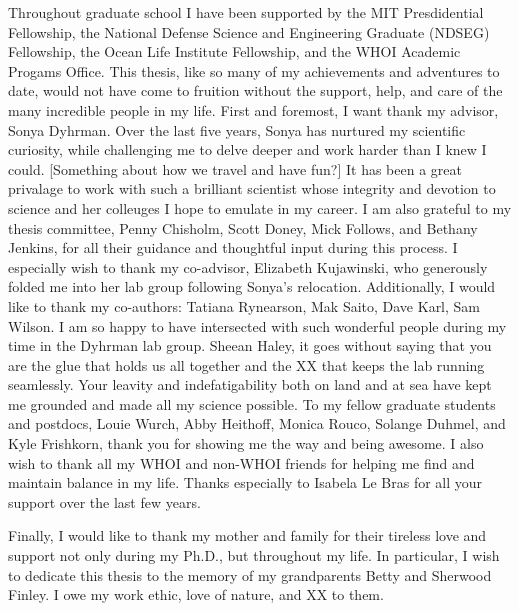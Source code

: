 Throughout graduate school I have been supported by the MIT Presdidential Fellowship, the National Defense Science and Engineering Graduate (NDSEG) Fellowship, the Ocean Life Institute Fellowship, and the WHOI Academic Progams Office. 
This thesis, like so many of my achievements and adventures to date, would not have come to fruition without the support, help, and care of the many incredible people in my life. 
First and foremost, I want thank my advisor, Sonya Dyhrman. Over the last five years, Sonya has nurtured my scientific curiosity, while challenging me to delve deeper and work harder than I knew I could. [Something about how we travel and have fun?] It has been a great privalage to work with such a brilliant scientist whose integrity and devotion to science and her colleuges I hope to emulate in my career. 
I am also grateful to my thesis committee, Penny Chisholm, Scott Doney, Mick Follows, and Bethany Jenkins, for all their guidance and thoughtful input during this process. I especially wish to thank my co-advisor, Elizabeth Kujawinski, who generously folded me into her lab group following Sonya's relocation. Additionally, I would like to thank my co-authors: Tatiana Rynearson, Mak Saito, Dave Karl, Sam Wilson. 
I am so happy to have intersected with such wonderful people during my time in the Dyhrman lab group. Sheean Haley, it goes without saying that you are the glue that holds us all together and the XX that keeps the lab running seamlessly. Your leavity and indefatigability both on land and at sea have kept me grounded and made all my science possible. To my fellow graduate students and postdocs, Louie Wurch, Abby Heithoff, Monica Rouco, Solange Duhmel, and Kyle Frishkorn, thank you for showing me the way and being awesome. I also wish to thank all my WHOI and non-WHOI friends for helping me find and maintain balance in my life. Thanks especially to Isabela Le Bras for all your support over the last few years. 

Finally, I would like to thank my mother and family for their tireless love and support not only during my Ph.D., but throughout my life. In particular, I wish to dedicate this thesis to the memory of my grandparents Betty and Sherwood Finley. I owe my work ethic, love of nature, and XX to them. 
